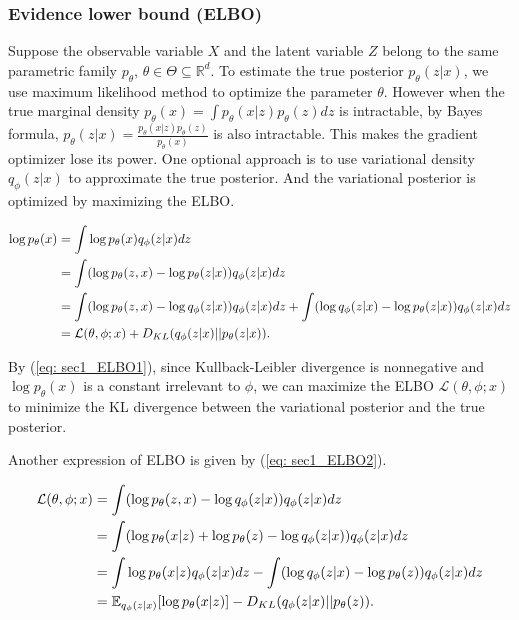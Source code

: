 \subsubsection{Evidence lower bound (ELBO)}

Suppose the observable variable $X$ and the latent variable $Z$ belong to the same parametric family $p_{\theta}$, $\theta\in\Theta\subseteq\mathbb{R}^d$. 
To estimate the true posterior $p_{\theta}(z|x)$, we use maximum likelihood method to optimize the parameter $\theta$.
However when the true marginal density $p_{\theta}(x)=\int p_{\theta}(x|z)p_{\theta}(z)dz$ is intractable, 
by Bayes formula, $p_{\theta}(z|x)=\frac{p_{\theta}(x|z)p_{\theta}(z)}{p_{\theta}(x)}$ is also intractable. 
This makes the gradient optimizer lose its power. 
One optional approach is to use variational density $q_{\phi}(z|x)$ to approximate the true posterior. 
And the variational posterior is optimized by maximizing the ELBO.  

\begin{align}
    \label{eq: sec1_ELBO1}
    \log p_{\theta}(x) &= \int\log p_{\theta}(x)q_{\phi}(z|x)dz \notag\\
                       &= \int(\log p_{\theta}(z,x) - \log p_{\theta}(z|x))q_{\phi}(z|x)dz \notag\\
                       &= \int(\log p_{\theta}(z,x) - \log q_{\phi}(z|x))q_{\phi}(z|x)dz + \int(\log q_{\phi}(z|x) - \log p_{\theta}(z|x))q_{\phi}(z|x)dz \notag\\
                       &= \mathcal{L}(\theta,\phi;x) + D_{KL}(q_{\phi}(z|x)||p_{\theta}(z|x)).
\end{align}

By (\ref{eq: sec1_ELBO1}), since Kullback-Leibler divergence is nonnegative and $\log p_{\theta}(x)$ is a constant irrelevant to $\phi$, 
we can maximize the ELBO $\mathcal{L}(\theta,\phi;x)$ to minimize the KL divergence between the variational posterior and the true posterior. 

Another expression of ELBO is given by (\ref{eq: sec1_ELBO2}).

\begin{align}
    \label{eq: sec1_ELBO2}
    \mathcal{L}(\theta,\phi;x) &= \int(\log p_{\theta}(z,x) - \log q_{\phi}(z|x))q_{\phi}(z|x)dz \notag\\
                               &= \int(\log p_{\theta}(x|z) + \log p_{\theta}(z) - \log q_{\phi}(z|x))q_{\phi}(z|x)dz \notag\\
                               &= \int\log p_{\theta}(x|z)q_{\phi}(z|x)dz - \int(\log q_{\phi}(z|x) - \log p_{\theta}(z))q_{\phi}(z|x)dz \notag\\
                               &= \mathbb{E}_{q_{\phi}(z|x)}[\log p_{\theta}(x|z)] - D_{KL}(q_{\phi}(z|x)||p_{\theta}(z)).
\end{align}

